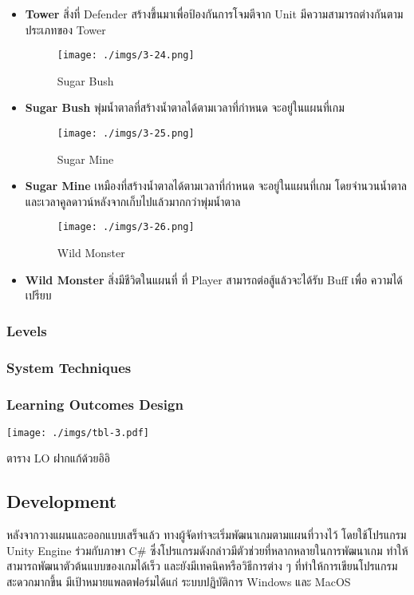 \documentclass[12pt,oneside,openright,a4paper]{cpe-thai-project}
\begin{document}
\begin{itemize}
  \item \textbf{Tower} สิ่งที่ Defender สร้างขึ้นมาเพื่อป้องกันการโจมตีจาก Unit 				
  มีความสามารถต่างกันตามประเภทของ Tower

  \begin{figure}[H]\centering
    \texttt{[image: ./imgs/3-24.png]}
    \caption{Sugar Bush}\label{fig:3-24}
  \end{figure}
  
  \item \textbf{Sugar Bush} พุ่มน้ำตาลที่สร้างน้ำตาลได้ตามเวลาที่กำหนด จะอยู่ในแผนที่เกม

  \begin{figure}[H]\centering
    \texttt{[image: ./imgs/3-25.png]}
    \caption{Sugar Mine}\label{fig:3-25}
  \end{figure}
  
  \item \textbf{Sugar Mine} เหมืองที่สร้างน้ำตาลได้ตามเวลาที่กำหนด จะอยู่ในแผนที่เกม 
  โดยจำนวนน้ำตาลและเวลาคูลดาวน์หลังจากเก็บไปแล้วมากกว่าพุ่มน้ำตาล

  \begin{figure}[H]\centering
    \texttt{[image: ./imgs/3-26.png]}
    \caption{Wild Monster}\label{fig:3-26}
  \end{figure}

  \item \textbf{Wild Monster} สิ่งมีชีวิตในแผนที่ ที่ Player สามารถต่อสู้แล้วจะได้รับ Buff เพื่อ
  ความได้เปรียบ
\end{itemize}

\subsubsection{Levels}


\subsubsection{System Techniques}


\subsubsection{Learning Outcomes Design}
\begin{table}[H]
  \texttt{[image: ./imgs/tbl-3.pdf]}
  \caption{ตาราง LO ฝากแก้ด้วยอิอิ}\label{tbl:tab-3}
\end{table}

\subsection{Development}
หลังจากวางแผนและออกแบบเสร็จแล้ว ทางผู้จัดทำจะเริ่มพัฒนาเกมตามแผนที่วางไว้ 
โดยใช้โปรแกรม Unity Engine ร่วมกับภาษา C\# ซึ่งโปรแกรมดังกล่าวมีตัวช่วยที่หลากหลายในการพัฒนาเกม 
ทำให้สามารถพัฒนาตัวต้นแบบของเกมได้เร็ว และยังมีเทคนิคหรือวิธีการต่าง ๆ ที่ทำให้การเขียนโปรแกรมสะดวกมากขึ้น 
มีเป้าหมายแพลตฟอร์มได้แก่ ระบบปฏิบัติการ Windows และ MacOS
\end{document}
